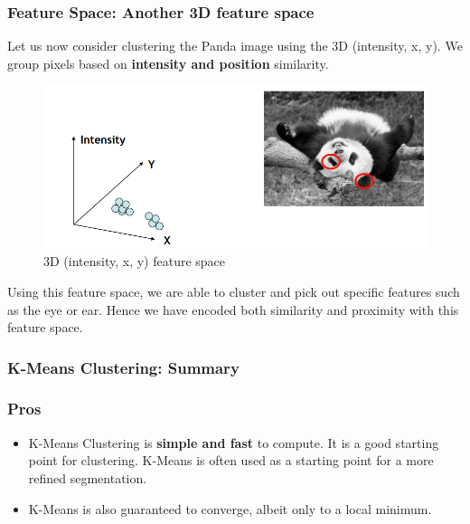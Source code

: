 \documentclass{article}
\begin{document}
\subsubsection{Feature Space: Another 3D feature space}

Let us now consider clustering the Panda image using the 3D (intensity, x, y). We group pixels based on \textbf{intensity and position} similarity.

\begin{figure}[htp]
    \centering
    \includegraphics[width=13cm]{slide_24_1}
    \caption{3D (intensity, x, y) feature space}
    \label{fig:Slide24_1}
\end{figure}

Using this feature space, we are able to cluster and pick out specific features such as the eye or ear. Hence we have encoded both similarity and proximity with this feature space.

\subsubsection{K-Means Clustering: Summary}
\subsubsection*{Pros}
\begin{itemize}
\item K-Means Clustering is \textbf{simple and fast} to compute. It is a good starting point for clustering. K-Means is often used as a starting point for a more refined segmentation.

\item K-Means is also guaranteed to converge, albeit only to a local minimum.
\end{itemize}
\end{document}
